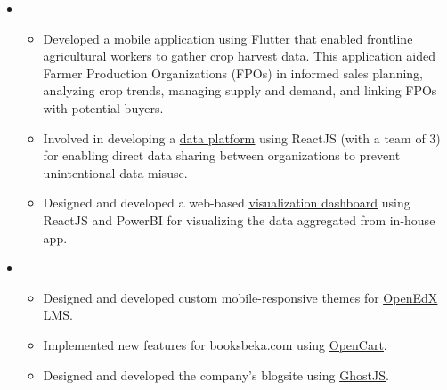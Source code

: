 \documentclass[11pt,a4paper,sans]{moderncv}
\begin{document}
\begin{itemize}

\item{}

\begin{itemize}
    \item Developed a mobile application using Flutter that enabled frontline agricultural workers to gather crop harvest data. This application aided Farmer Production Organizations (FPOs) in informed sales planning, analyzing crop trends, managing supply and demand, and linking FPOs with potential buyers.
    
    \item Involved in developing a {\href{https://farmstack.co/}{\underline {data platform}}} using ReactJS (with a team of 3) for enabling direct data sharing between organizations to prevent unintentional data misuse.  

    \item Designed and developed a web-based {\href{https://dashboard.digitalgreen.org/}{\underline {visualization dashboard}}} using ReactJS and PowerBI for visualizing the data aggregated from in-house app.
    
\end{itemize}


\vspace{6pt}



\item{}

\begin{itemize}
    \item Designed and developed custom mobile-responsive themes for {\href{https://openedx.org/}{\underline {OpenEdX}}} LMS.
    
    \item Implemented new features for booksbeka.com using {\href{https://www.opencart.com/}{\underline {OpenCart}}}.
    
    \item Designed and developed the company’s blogsite using {\href{https://ghost.org/}{\underline {GhostJS}}}.

\end{itemize}

\vspace{6pt}


\end{itemize}
\end{document}
